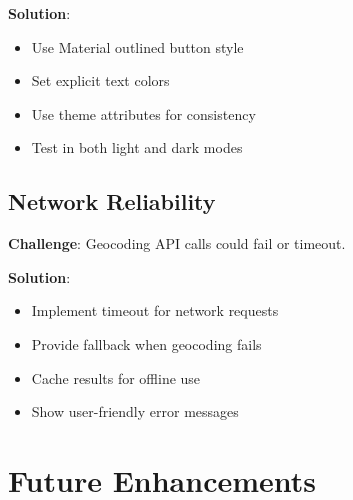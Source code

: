\documentclass[12pt,a4paper]{article}
\begin{document}
\textbf{Solution}:
\begin{itemize}
    \item Use Material outlined button style
    \item Set explicit text colors
    \item Use theme attributes for consistency
    \item Test in both light and dark modes
\end{itemize}

\subsection{Network Reliability}
\textbf{Challenge}: Geocoding API calls could fail or timeout.

\textbf{Solution}:
\begin{itemize}
    \item Implement timeout for network requests
    \item Provide fallback when geocoding fails
    \item Cache results for offline use
    \item Show user-friendly error messages
\end{itemize}

\newpage

\section{Future Enhancements}
\end{document}
